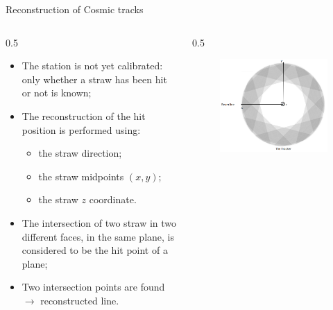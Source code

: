 \documentclass{beamer}[10pt]
\begin{document}
\begin{frame}{Reconstruction of Cosmic tracks}
  \begin{columns}
    \begin{column}{0.5 \framewidth}
      \begin{itemize}
  \item The station is not yet calibrated: only whether a straw has been hit or not is known;
  \vspace{2mm}

  \item The reconstruction of the hit position is performed using:
  \vspace{1mm}

    \begin{itemize}
        \item the straw direction;
        \vspace{1mm}

        \item the straw midpoints $(x,y)$;
        \vspace{1mm}
        \item the straw $z$ coordinate.
    \end{itemize} 
    \vspace{2mm}
    \item The intersection of two straw in two different faces, in the same plane, is considered to be the hit point of a plane;
    \vspace{1mm}
    \item  Two intersection points are found $\rightarrow$ reconstructed line.
  \end{itemize} 
  \end{column}
  \begin{column}{0.5 \framewidth}
    \begin{figure}[H]
      \centering
      \includegraphics[width=0.8 \columnwidth]{figures/png/Screenshot_20240408_154724.png}
      \label{fig:enter-label}
  \end{figure}
  \end{column}

  \end{columns}
  \end{frame}
\end{document}
